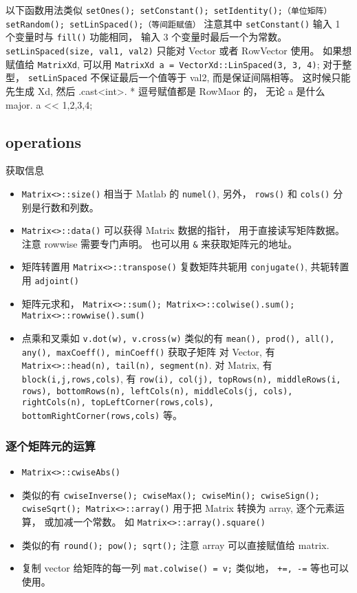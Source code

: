以下函数用法类似
\verb`setOnes(); setConstant(); setIdentity();（单位矩阵） setRandom(); setLinSpaced();（等间距赋值）`
注意其中 \verb`setConstant()` 输入 1 个变量时与 \verb`fill()` 功能相同， 输入 3 个变量时最后一个为常数。 \verb`setLinSpaced(size, val1, val2)` 只能对 Vector 或者 RowVector 使用。 如果想赋值给 \verb`MatrixXd`, 可以用 \verb`MatrixXd a = VectorXd::LinSpaced(3, 3, 4)`; 对于整型， \verb`setLinSpaced` 不保证最后一个值等于 val2, 而是保证间隔相等。 这时候只能先生成 Xd, 然后 .cast<int>.
* 逗号赋值都是 RowMaor 的， 无论 a 是什么 major.
a << 1,2,3,4;

\subsection{operations}
获取信息
\begin{itemize}
\item \verb`Matrix<>::size()` 相当于 Matlab 的 \verb`numel()`, 另外， \verb`rows()` 和 \verb`cols()` 分别是行数和列数。
\item \verb`Matrix<>::data()` 可以获得 Matrix 数据的指针， 用于直接读写矩阵数据。 注意 rowwise 需要专门声明。 也可以用 \verb`&` 来获取矩阵元的地址。
\item 矩阵转置用 \verb`Matrix<>::transpose()` 复数矩阵共轭用 \verb`conjugate()`, 共轭转置用 \verb`adjoint()`
\item 矩阵元求和， \verb`Matrix<>::sum(); Matrix<>::colwise().sum(); Matrix<>::rowwise().sum()`
\item 点乘和叉乘如 \verb`v.dot(w), v.cross(w)`
类似的有 \verb`mean(), prod(), all(), any(), maxCoeff(), minCoeff()`
获取子矩阵
对 Vector, 有 \verb`Matrix<>::head(n), tail(n), segment(n)`. 对 Matrix, 有 \verb`block(i,j,rows,cols)`, 有 \verb`row(i), col(j), topRows(n), middleRows(i, rows), bottomRows(n), leftCols(n), middleCols(j, cols), rightCols(n), topLeftCorner(rows,cols), bottomRightCorner(rows,cols)` 等。
\end{itemize}


\subsubsection{逐个矩阵元的运算}
\begin{itemize}
\item \verb`Matrix<>::cwiseAbs()`
\item 类似的有 \verb`cwiseInverse(); cwiseMax(); cwiseMin(); cwiseSign(); cwiseSqrt(); Matrix<>::array()` 用于把 Matrix 转换为 array, 逐个元素运算， 或加减一个常数。 如 \verb`Matrix<>::array().square()`
\item 类似的有 \verb`round(); pow(); sqrt();` 注意 array 可以直接赋值给 matrix.
\item 复制 vector 给矩阵的每一列 \verb`mat.colwise() = v;` 类似地， \verb`+=, -=` 等也可以使用。
\end{itemize}


